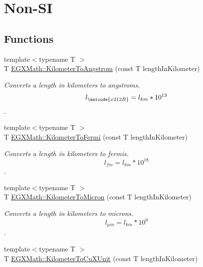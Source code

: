 \hypertarget{group___e_g_x_math-_conversions-_length_conversions-_kilometer-_non-_s_i}{}\section{Non-\/\+SI}
\label{group___e_g_x_math-_conversions-_length_conversions-_kilometer-_non-_s_i}
\subsection*{Functions}
\begin{DoxyCompactItemize}
\item 
{\footnotesize template$<$typename T $>$ }\\T \mbox{\hyperlink{group___e_g_x_math-_conversions-_length_conversions-_kilometer-_non-_s_i_ga415a412a1b03916d6071a206a3318035}{E\+G\+X\+Math\+::\+Kilometer\+To\+Angstrom}} (const T length\+In\+Kilometer)
\begin{DoxyCompactList}\small\item\em Converts a length in kilometers to angstroms. \[ l_{\unicode{x212B}}=l_{km} * 10^{13} \]. \end{DoxyCompactList}\item 
{\footnotesize template$<$typename T $>$ }\\T \mbox{\hyperlink{group___e_g_x_math-_conversions-_length_conversions-_kilometer-_non-_s_i_ga9c38d019deb86a60173d5d2b65a1ef57}{E\+G\+X\+Math\+::\+Kilometer\+To\+Fermi}} (const T length\+In\+Kilometer)
\begin{DoxyCompactList}\small\item\em Converts a length in kilometers to fermis. \[ l_{fm}=l_{km} * 10^{18} \]. \end{DoxyCompactList}\item 
{\footnotesize template$<$typename T $>$ }\\T \mbox{\hyperlink{group___e_g_x_math-_conversions-_length_conversions-_kilometer-_non-_s_i_gae662bafe0d1fc36276a336fd969307a0}{E\+G\+X\+Math\+::\+Kilometer\+To\+Micron}} (const T length\+In\+Kilometer)
\begin{DoxyCompactList}\small\item\em Converts a length in kilometers to microns. \[ l_{\mu m}=l_{km} * 10^{9} \]. \end{DoxyCompactList}\item 
{\footnotesize template$<$typename T $>$ }\\T \mbox{\hyperlink{group___e_g_x_math-_conversions-_length_conversions-_kilometer-_non-_s_i_ga0614eb6a9e8bf1a9ba6cf51121f22083}{E\+G\+X\+Math\+::\+Kilometer\+To\+Cu\+X\+Unit}} (const T length\+In\+Kilometer)

\end{DoxyCompactItemize}
